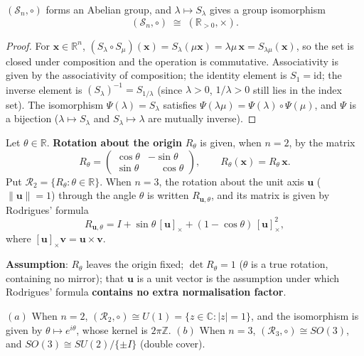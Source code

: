 \begin{lemma}\label{lem:scaling_group}
$(\mathcal{S}_n, \circ)$ forms an Abelian group, and $\lambda \mapsto S_{\lambda}$ gives a group isomorphism
\[
(\mathcal{S}_n, \circ) \;\cong\; (\mathbb{R}_{>0}, \times).
\]
\end{lemma}

\begin{proof}
For $\mathbf{x}\in\mathbb R^n$, $(S_\lambda \circ S_\mu)(\mathbf{x}) = S_\lambda(\mu\mathbf{x}) = \lambda\mu\,\mathbf{x} = S_{\lambda\mu}(\mathbf{x})$, so the set is closed under composition and the operation is commutative. Associativity is given by the associativity of composition; the identity element is $S_1=\mathrm{id}$; the inverse element is $(S_\lambda)^{-1}=S_{1/\lambda}$ (since $\lambda>0$, $1/\lambda>0$ still lies in the index set). The isomorphism $\Psi(\lambda)=S_\lambda$ satisfies $\Psi(\lambda\mu)=\Psi(\lambda)\circ\Psi(\mu)$, and $\Psi$ is a bijection ($\lambda\mapsto S_\lambda$ and $S_\lambda\mapsto\lambda$ are mutually inverse).
\end{proof}

\begin{definition}\label{def:rotation_map}
Let $\theta \in \mathbb{R}$. \textbf{Rotation about the origin} $R_\theta$ is given, when $n=2$, by the matrix
\[
R_\theta =
\begin{pmatrix}
\cos\theta & -\sin\theta \\
\sin\theta & \phantom{-}\cos\theta
\end{pmatrix},
\qquad
R_\theta(\mathbf{x}) = R_\theta\,\mathbf{x}.
\]
Put $\mathcal{R}_2 = \{R_\theta : \theta \in \mathbb{R}\}$. When $n=3$, the rotation about the unit axis $\mathbf{u}$ ($\|\mathbf{u}\|=1$) through the angle $\theta$ is written $R_{\mathbf{u},\theta}$, and its matrix is given by Rodrigues' formula
\[
R_{\mathbf{u},\theta}
= I + \sin\theta\,[\mathbf{u}]_\times + (1-\cos\theta)\,[\mathbf{u}]_\times^2,
\]
where $[\mathbf{u}]_\times \mathbf{v} = \mathbf{u}\times\mathbf{v}$.

\textbf{Assumption}: $R_\theta$ leaves the origin fixed; $\det R_\theta = 1$ ($\theta$ is a true rotation, containing no mirror); that $\mathbf u$ is a unit vector is the assumption under which Rodrigues' formula \textbf{contains no extra normalisation factor}.
\end{definition}

\begin{lemma}\label{lem:rotation_group}
$(a)$ When $n=2$, $(\mathcal{R}_2, \circ) \cong U(1) = \{z \in \mathbb{C} : |z| = 1\}$, and the isomorphism is given by $\theta \mapsto e^{i\theta}$, whose kernel is $2\pi\mathbb{Z}$.
$(b)$ When $n=3$, $(\mathcal{R}_3,\circ)\cong SO(3)$, and $SO(3) \cong SU(2)/\{\pm I\}$ (double cover).
\end{lemma}

